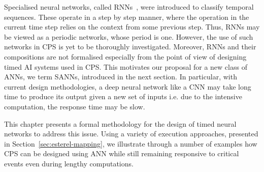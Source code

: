 Specialised neural networks, called \acfp{RNN}~\cite{medsker2001recurrent}, were introduced  
 to classify temporal sequences. These operate in a step by step manner, where the operation in the current 
time step relies on the context from some previous step. Thus, \acp{RNN} may be viewed as a periodic networks, whose
 period is one. However, the 
use of such networks in \ac{CPS} is yet to be thoroughly investigated. Moreover, 
\acp{RNN} and their compositions are not formalised especially from the point of view of designing timed AI 
systems used in \ac{CPS}. This motivates our proposal for a new class of \acp{ANN}, we term \acfp{SANN}, introduced in the next section.
In particular, with current design methodologies, a deep neural network like a \ac{CNN} may take long time 
to produce its output given a new set of inputs i.e. due to the intensive computation, the response time may be slow. 

This chapter presents a formal methodology for the design of timed neural networks to address this issue.
Using a variety of execution approaches, presented in  Section~\ref{sec:esterel-mapping}, we illustrate through a number
of examples how \ac{CPS} can be designed using \ac{ANN} while still remaining responsive to critical events even during lengthy computations.


